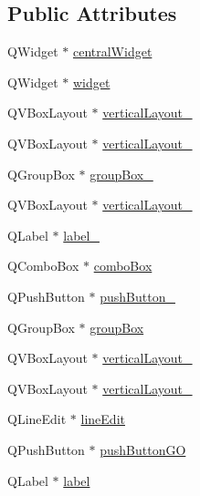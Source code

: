 \subsection*{Public Attributes}
\begin{DoxyCompactItemize}
\item 
Q\-Widget $\ast$ \hyperlink{class_ui___main_window_a30075506c2116c3ed4ff25e07ae75f81}{central\-Widget}
\item 
Q\-Widget $\ast$ \hyperlink{class_ui___main_window_ab676f235c393f334b7c07935d4007925}{widget}
\item 
Q\-V\-Box\-Layout $\ast$ \hyperlink{class_ui___main_window_a6f40fc110b15410c00837a446d57bdbe}{vertical\-Layout\-\_}
\item 
Q\-V\-Box\-Layout $\ast$ \hyperlink{class_ui___main_window_a38b8a4b887f3b58e2a49e7905ae6f1f0}{vertical\-Layout\-\_}
\item 
Q\-Group\-Box $\ast$ \hyperlink{class_ui___main_window_af87dc4910dc4b3434047edbb31527969}{group\-Box\-\_}
\item 
Q\-V\-Box\-Layout $\ast$ \hyperlink{class_ui___main_window_aaa8cc393d5a44562d629a9f646d2c6dd}{vertical\-Layout\-\_}
\item 
Q\-Label $\ast$ \hyperlink{class_ui___main_window_a2e2516d755e4dd53fc905dabddf2738a}{label\-\_}
\item 
Q\-Combo\-Box $\ast$ \hyperlink{class_ui___main_window_af4df84479fcdbcc4c6d2d3e39046317a}{combo\-Box}
\item 
Q\-Push\-Button $\ast$ \hyperlink{class_ui___main_window_a59a7d8124bce933d63f53f2153d447b4}{push\-Button\-\_}
\item 
Q\-Group\-Box $\ast$ \hyperlink{class_ui___main_window_aef7cb3be8cecfc9aaf98f036a98781ce}{group\-Box}
\item 
Q\-V\-Box\-Layout $\ast$ \hyperlink{class_ui___main_window_a93c190b085c63a667c535ba0bbcfec7c}{vertical\-Layout\-\_}
\item 
Q\-V\-Box\-Layout $\ast$ \hyperlink{class_ui___main_window_afcc20a3d5058037a00cdc6122f231848}{vertical\-Layout\-\_}
\item 
Q\-Line\-Edit $\ast$ \hyperlink{class_ui___main_window_a7a5b9a4633d64f502ce81da3202d828c}{line\-Edit}
\item 
Q\-Push\-Button $\ast$ \hyperlink{class_ui___main_window_a5e73aa9808d96aef650ab0eaaba4757f}{push\-Button\-G\-O}
\item 
Q\-Label $\ast$ \hyperlink{class_ui___main_window_ad9c89133780f28e6efa2ec17ceb9cff5}{label}
\item 

\end{DoxyCompactItemize}
